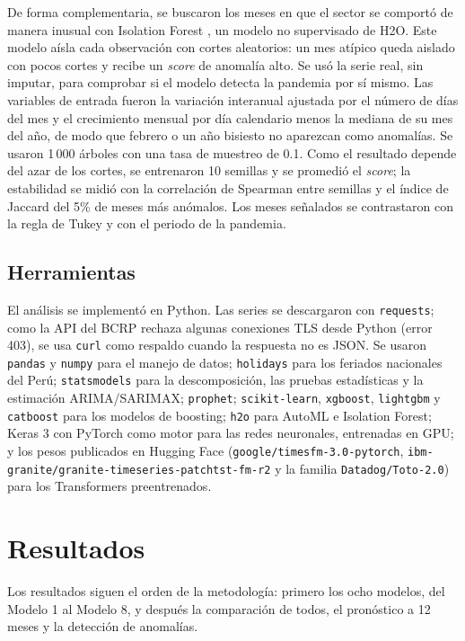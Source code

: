 \documentclass[conference]{IEEEtran}
\newcommand{\code}[1]{\texttt{#1}}
\begin{document}
De forma complementaria, se buscaron los meses en que el sector se comportó de manera inusual con Isolation Forest \cite{liu2008}, un modelo no supervisado de H2O. Este modelo aísla cada observación con cortes aleatorios: un mes atípico queda aislado con pocos cortes y recibe un \textit{score} de anomalía alto. Se usó la serie real, sin imputar, para comprobar si el modelo detecta la pandemia por sí mismo. Las variables de entrada fueron la variación interanual ajustada por el número de días del mes y el crecimiento mensual por día calendario menos la mediana de su mes del año, de modo que febrero o un año bisiesto no aparezcan como anomalías. Se usaron 1\,000 árboles con una tasa de muestreo de 0.1. Como el resultado depende del azar de los cortes, se entrenaron 10 semillas y se promedió el \textit{score}; la estabilidad se midió con la correlación de Spearman entre semillas y el índice de Jaccard del 5\% de meses más anómalos. Los meses señalados se contrastaron con la regla de Tukey y con el periodo de la pandemia.

\subsection{Herramientas}

El análisis se implementó en Python. Las series se descargaron con \code{requests}; como la API del BCRP rechaza algunas conexiones TLS desde Python (error 403), se usa \code{curl} como respaldo cuando la respuesta no es JSON. Se usaron \code{pandas} y \code{numpy} para el manejo de datos; \code{holidays} para los feriados nacionales del Perú; \code{statsmodels} para la descomposición, las pruebas estadísticas y la estimación ARIMA/SARIMAX; \code{prophet}; \code{scikit-learn}, \code{xgboost}, \code{lightgbm} y \code{catboost} para los modelos de boosting; \code{h2o} para AutoML e Isolation Forest; Keras 3 con PyTorch como motor para las redes neuronales, entrenadas en GPU; y los pesos publicados en Hugging Face (\code{google/timesfm-3.0-pytorch}, \code{ibm-granite/granite-timeseries-patchtst-fm-r2} y la familia \code{Datadog/Toto-2.0}) para los Transformers preentrenados.

\section{Resultados}
\label{sec:resultados}

Los resultados siguen el orden de la metodología: primero los ocho modelos, del Modelo 1 al Modelo 8, y después la comparación de todos, el pronóstico a 12 meses y la detección de anomalías.
\end{document}
